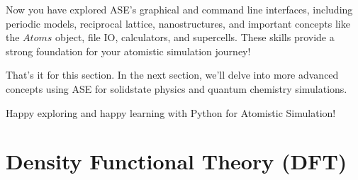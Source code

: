 \documentclass[letterpaper,10pt,english]{sphinxmanual}
\begin{document}
\sphinxAtStartPar
Now you have explored ASE’s graphical and command line interfaces, including periodic models, reciprocal lattice, nanostructures, and important concepts like the \(Atoms\) object, file IO, calculators, and supercells. These skills provide a strong foundation for your atomistic simulation journey!

\sphinxAtStartPar
That’s it for this section. In the next section, we’ll delve into more advanced concepts using ASE for solid\sphinxhyphen{}state physics and quantum chemistry simulations.

\sphinxAtStartPar
Happy exploring and happy learning with Python for Atomistic Simulation!

\sphinxstepscope


\chapter{Density Functional Theory (DFT)}
\label{\detokenize{dft/dft:density-functional-theory-dft}}\label{\detokenize{dft/dft::doc}}
\end{document}
